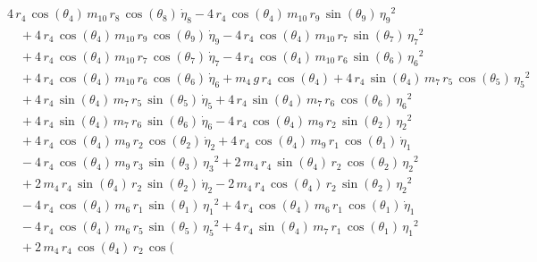 \begin{eqnarray*} && 4\,r_{4}\,\cos({\theta_{4}})\,m_{10}\,r_{8}\,\cos
({\theta_{8}})\,{\dot{\eta}_{8}} - 4\,r_{4}\,\cos({\theta_{4}})\,m_{10
}\,r_{9}\,\sin({\theta_{9}})\,{{\eta_{9}}}^2 \\ &&\quad\mbox{} + 4\,r
_{4}\,\cos({\theta_{4}})\,m_{10}\,r_{9}\,\cos({\theta_{9}})\,{
\dot{\eta}_{9}} - 4\,r_{4}\,\cos({\theta_{4}})\,m_{10}\,r_{7}\,\sin({
\theta_{7}})\,{{\eta_{7}}}^2 \\ &&\quad\mbox{} + 4\,r_{4}\,\cos({
\theta_{4}})\,m_{10}\,r_{7}\,\cos({\theta_{7}})\,{\dot{\eta}_{7}} - 4
\,r_{4}\,\cos({\theta_{4}})\,m_{10}\,r_{6}\,\sin({\theta_{6}})\,{{\eta
_{6}}}^2 \\ &&\quad\mbox{} + 4\,r_{4}\,\cos({\theta_{4}})\,m_{10}\,r_{
6}\,\cos({\theta_{6}})\,{\dot{\eta}_{6}} + m_{4}\,g\,r_{4}\,\cos({
\theta_{4}}) + 4\,r_{4}\,\sin({\theta_{4}})\,m_{7}\,r_{5}\,\cos({
\theta_{5}})\,{{\eta_{5}}}^2 \\ &&\quad\mbox{} + 4\,r_{4}\,\sin({
\theta_{4}})\,m_{7}\,r_{5}\,\sin({\theta_{5}})\,{\dot{\eta}_{5}} + 4\,
r_{4}\,\sin({\theta_{4}})\,m_{7}\,r_{6}\,\cos({\theta_{6}})\,{{\eta_{6
}}}^2 \\ &&\quad\mbox{} + 4\,r_{4}\,\sin({\theta_{4}})\,m_{7}\,r_{6}\,
\sin({\theta_{6}})\,{\dot{\eta}_{6}} - 4\,r_{4}\,\cos({\theta_{4}})\,m
_{9}\,r_{2}\,\sin({\theta_{2}})\,{{\eta_{2}}}^2 \\ &&\quad\mbox{} + 4
\,r_{4}\,\cos({\theta_{4}})\,m_{9}\,r_{2}\,\cos({\theta_{2}})\,{
\dot{\eta}_{2}} + 4\,r_{4}\,\cos({\theta_{4}})\,m_{9}\,r_{1}\,\cos({
\theta_{1}})\,{\dot{\eta}_{1}} \\ &&\quad\mbox{} - 4\,r_{4}\,\cos({
\theta_{4}})\,m_{9}\,r_{3}\,\sin({\theta_{3}})\,{{\eta_{3}}}^2 + 2\,m
_{4}\,r_{4}\,\sin({\theta_{4}})\,r_{2}\,\cos({\theta_{2}})\,{{\eta_{2}
}}^2 \\ &&\quad\mbox{} + 2\,m_{4}\,r_{4}\,\sin({\theta_{4}})\,r_{2}\,
\sin({\theta_{2}})\,{\dot{\eta}_{2}} - 2\,m_{4}\,r_{4}\,\cos({\theta_{
4}})\,r_{2}\,\sin({\theta_{2}})\,{{\eta_{2}}}^2 \\ &&\quad\mbox{} - 4
\,r_{4}\,\cos({\theta_{4}})\,m_{6}\,r_{1}\,\sin({\theta_{1}})\,{{\eta
_{1}}}^2 + 4\,r_{4}\,\cos({\theta_{4}})\,m_{6}\,r_{1}\,\cos({\theta_{1
}})\,{\dot{\eta}_{1}} \\ &&\quad\mbox{} - 4\,r_{4}\,\cos({\theta_{4}})
\,m_{6}\,r_{5}\,\sin({\theta_{5}})\,{{\eta_{5}}}^2 + 4\,r_{4}\,\sin({
\theta_{4}})\,m_{7}\,r_{1}\,\cos({\theta_{1}})\,{{\eta_{1}}}^2
 \\ &&\quad\mbox{} + 2\,m_{4}\,r_{4}\,\cos({\theta_{4}})\,r_{2}\,\cos(

\end{eqnarray*}
